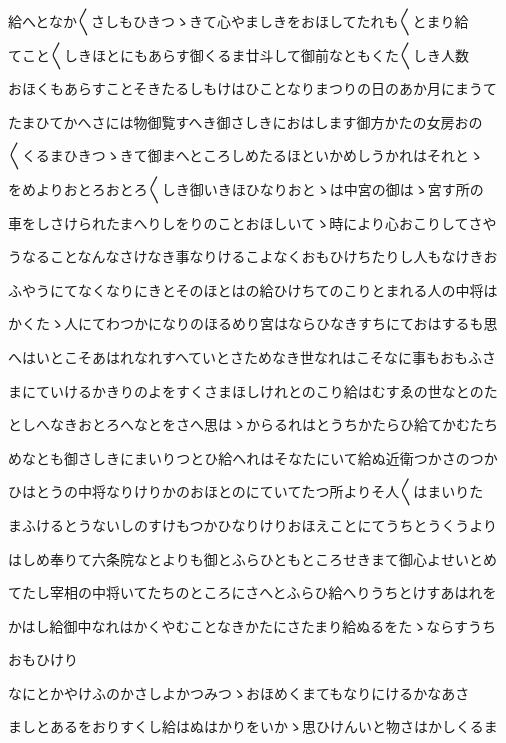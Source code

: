 \documentclass[a4paper,11pt,landscape]{ltjtarticle}
\begin{document}
給へとなか〱さしもひきつゝきて心やましきをおほしてたれも〱とまり給
\par\medskip
てこと〱しきほとにもあらす御くるま廿斗して御前なともくた〱しき人数
\par\medskip
おほくもあらすことそきたるしもけはひことなりまつりの日のあか月にまうて
\par\medskip
たまひてかへさには物御覧すへき御さしきにおはします御方かたの女房おの
\par\medskip
〱くるまひきつゝきて御まへところしめたるほといかめしうかれはそれとゝ
\par\medskip
をめよりおとろおとろ〱しき御いきほひなりおとゝは中宮の御はゝ宮す所の
\par\medskip
車をしさけられたまへりしをりのことおほしいてゝ時により心おこりしてさや
\par\medskip
うなることなんなさけなき事なりけるこよなくおもひけちたりし人もなけきお
\par\medskip
ふやうにてなくなりにきとそのほとはの給ひけちてのこりとまれる人の中将は
\par\medskip
かくたゝ人にてわつかになりのほるめり宮はならひなきすちにておはするも思
\par\medskip
へはいとこそあはれなれすへていとさためなき世なれはこそなに事もおもふさ
\par\medskip
まにていけるかきりのよをすくさまほしけれとのこり給はむすゑの世なとのた
\par\medskip
としへなきおとろへなとをさへ思はゝからるれはとうちかたらひ給てかむたち
\par\medskip
めなとも御さしきにまいりつとひ給へれはそなたにいて給ぬ近衛つかさのつか
\par\medskip
ひはとうの中将なりけりかのおほとのにていてたつ所よりそ人〱はまいりた
\par\medskip
まふけるとうないしのすけもつかひなりけりおほえことにてうちとうくうより
\par\medskip
はしめ奉りて六条院なとよりも御とふらひともところせきまて御心よせいとめ
\par\medskip
てたし宰相の中将いてたちのところにさへとふらひ給へりうちとけすあはれを
\par\medskip
かはし給御中なれはかくやむことなきかたにさたまり給ぬるをたゝならすうち
\par\medskip
おもひけり
\par\medskip
なにとかやけふのかさしよかつみつゝおほめくまてもなりにけるかなあさ
\par\medskip
ましとあるをおりすくし給はぬはかりをいかゝ思ひけんいと物さはかしくるま
\par\medskip
\end{document}
